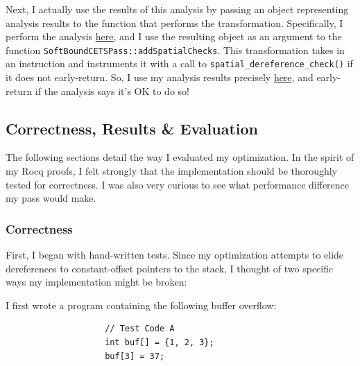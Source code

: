 \documentclass{article}
\begin{document}
        Next, I actually  use the results of this analysis by passing an object
        representing analysis results to the function that performs the transformation.
    Specifically, I perform the analysis \href{https://github.com/parthsarkar17/softboundcets-ese5370/blob/009263fa16b6ff7cc22f6afadf9561a9507f60b0/llvm-project/llvm/lib/Transforms/SoftBoundCETS/SoftBoundCETS.cpp#L4061}{here},
        and I use the resulting object as an argument to the function \verb|SoftBoundCETSPass::addSpatialChecks|.
        This transformation takes in an instruction and instruments it with a
        call to \verb|spatial_dereference_check()| if it does not early-return.
        So, I use my analysis results precisely 
        \href{https://github.com/parthsarkar17/softboundcets-ese5370/blob/009263fa16b6ff7cc22f6afadf9561a9507f60b0/llvm-project/llvm/lib/Transforms/SoftBoundCETS/SoftBoundCETS.cpp#L3407}{here}, 
        and early-return if the analysis says it's OK to do so!

        \subsection{Correctness, Results \& Evaluation}
            
            The following sections detail the way I evaluated my optimization.
            In the spirit of my Rocq proofs, I felt strongly that the 
            implementation should be thoroughly tested for correctness. I was
            also very curious to see what performance difference my pass would make.

            \subsubsection{Correctness}

                First, I began with hand-written tests. Since my optimization
                attempts to elide dereferences to constant-offset pointers to 
                the stack, I thought of two specific ways my implementation might
                be broken:

                \bigbreak{}

                I first wrote a program containing the following buffer overflow:

                \begin{verbatim}
                    // Test Code A
                    int buf[] = {1, 2, 3};
                    buf[3] = 37;
                \end{verbatim}
\end{document}
